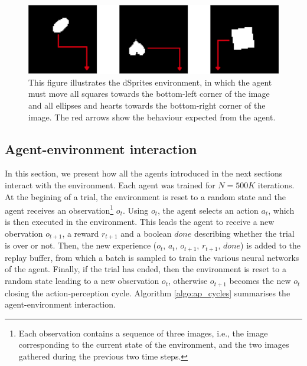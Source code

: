 \documentclass[twoside,11pt]{article}
\begin{document}
\begin{figure}[h]
	\begin{center}
	\includegraphics[scale=0.4]{dSprites_env}
	\end{center}
  \caption{This figure illustrates the dSprites environment, in which the agent must move all squares towards the bottom-left corner of the image and all ellipses and hearts towards the bottom-right corner of the image. The red arrows show the behaviour expected from the agent.}
   \label{fig:dSprites_env}
\end{figure}

\subsection{Agent-environment interaction} \label{ssec:env_agent_iter}

In this section, we present how all the agents introduced in the next sections interact with the environment. Each agent was trained for $N = 500K$ iterations. At the begining of a trial, the environment is reset to a random state and the agent receives an observation\footnote{Each observation contains a sequence of three images, i.e., the image corresponding to the current state of the environment, and the two images gathered during the previous two time steps.} $o_t$. Using $o_t$, the agent selects an action $a_t$, which is then executed in the environment. This leads the agent to receive a new obervation $o_{t+1}$, a reward $r_{t+1}$ and a boolean $done$ describing whether the trial is over or not. Then, the new experience ($o_t$, $a_t$, $o_{t+1}$, $r_{t+1}$, $done$) is added to the replay buffer, from which a batch is sampled to train the various neural networks of the agent. Finally, if the trial has ended, then the environment is reset to a random state leading to a new observation $o_t$, otherwise $o_{t+1}$ becomes the new $o_t$ closing the action-perception cycle. Algorithm \ref{algo:ap_cycles} summarises the agent-environment interaction.
\end{document}
